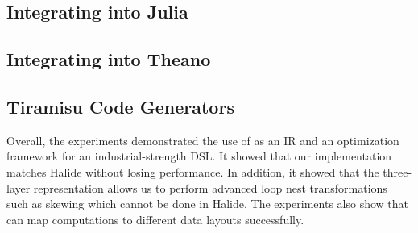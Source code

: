 \subsection{Integrating \framework into Julia}



\subsection{Integrating \framework into Theano}


\subsection{Tiramisu Code Generators}


Overall, the experiments demonstrated the use of \framework as an IR and an optimization framework for an industrial-strength DSL.  It showed that our implementation matches Halide without losing performance.  In addition, it showed that the three-layer representation allows us to perform advanced loop nest transformations such as skewing which cannot be done in Halide.
The experiments also show that \framework can map computations to different data layouts successfully. %
